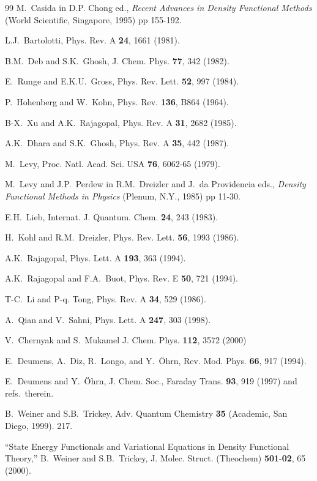 \begin{thebibliography}{99}
 M.~Casida in D.P. Chong ed., {\it Recent Advances in
Density Functional Methods} (World Scientific, Singapore, 1995) pp 155-192.

 L.J.~Bartolotti, Phys. Rev. A {\bf 24}, 1661 (1981).

 B.M.~Deb and S.K.~Ghosh, J. Chem. Phys. {\bf 77}, 342
(1982).

 E.~Runge and E.K.U.~Gross, Phys. Rev. Lett. {\bf 52}, 997
(1984).

 P.~Hohenberg and W.~Kohn, Phys. Rev. {\bf 136}, B864 (1964).

 B-X.~Xu and A.K.~Rajagopal, Phys. Rev. A {\bf 31}, 2682
(1985).

 A.K.~Dhara and S.K.~Ghosh, Phys. Rev. A {\bf 35}, 442
(1987).

 M.~Levy, Proc. Natl. Acad. Sci. USA {\bf 76}, 6062-65
(1979).

 M.~Levy and J.P.~Perdew in R.M.~Dreizler and J.~da
Providencia eds., {\it Density Functional Methods in Physics} (Plenum, N.Y.,
1985) pp 11-30.

 E.H.~Lieb, Internat. J. Quantum. Chem. {\bf 24}, 243 (1983).

 H.~Kohl and R.M.~Dreizler, Phys. Rev. Lett. {\bf 56}, 1993
(1986).

 A.K.~Rajagopal, Phys. Lett. A {\bf 193}, 363 (1994).

 A.K.~Rajagopal and F.A.~Buot, Phys. Rev. E {\bf 50},
721 (1994).

 T-C.~Li and P-q. Tong, Phys. Rev. A {\bf 34}, 529 (1986).

 A.~Qian and V.~Sahni, Phys. Lett. A {\bf 247}, 303 (1998).

 V.~Chernyak and S.~Mukamel J. Chem. Phys. {\bf 112},
3572 (2000)

 E.~Deumens, A.~Diz, R.~Longo, and Y.~{\"O}hrn, Rev. Mod.
Phys. {\bf 66}, 917 (1994).

 E.~Deumens and Y.~{\"O}hrn, J. Chem. Soc., Faraday Trans. 
{\bf 93}, 919 (1997) and refs.~therein.

 B.~Weiner and S.B.~Trickey, Adv. Quantum Chemistry {\bf %
35} (Academic, San Diego, 1999). 217.

 ``State Energy Functionals and Variational Equations in
Density Functional Theory,'' B.~Weiner and S.B.~Trickey, J. Molec. Struct.
(Theochem) {\bf 501}-{\bf 02}, 65 (2000).


\end{thebibliography}
